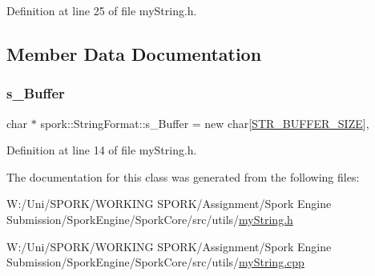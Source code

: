 Definition at line 25 of file my\+String.\+h.



\subsection{Member Data Documentation}
\mbox{\label{classspork_1_1_string_format_a79267c6edd1e417dc8c983c192b1987e}} 
\subsubsection{\texorpdfstring{s\+\_\+\+Buffer}{s\_Buffer}}
{\footnotesize\ttfamily char $\ast$ spork\+::\+String\+Format\+::s\+\_\+\+Buffer = new char\mbox{[}\hyperlink{my_string_8h_a95e531d3a58c0adb143121e47391de94}{S\+T\+R\+\_\+\+B\+U\+F\+F\+E\+R\+\_\+\+S\+I\+ZE}\mbox{]}\hspace{0.3cm}{\ttfamily [static]}, {\ttfamily [private]}}



Definition at line 14 of file my\+String.\+h.



The documentation for this class was generated from the following files\+:\begin{DoxyCompactItemize}
\item 
W\+:/\+Uni/\+S\+P\+O\+R\+K/\+W\+O\+R\+K\+I\+N\+G S\+P\+O\+R\+K/\+Assignment/\+Spork Engine Submission/\+Spork\+Engine/\+Spork\+Core/src/utils/\hyperlink{my_string_8h}{my\+String.\+h}\item 
W\+:/\+Uni/\+S\+P\+O\+R\+K/\+W\+O\+R\+K\+I\+N\+G S\+P\+O\+R\+K/\+Assignment/\+Spork Engine Submission/\+Spork\+Engine/\+Spork\+Core/src/utils/\hyperlink{my_string_8cpp}{my\+String.\+cpp}\end{DoxyCompactItemize}
